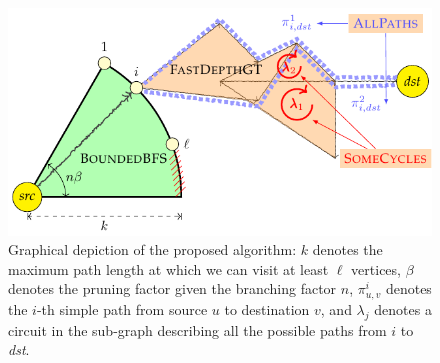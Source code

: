 \documentclass[sigconf]{acmart}
\begin{document}
\begin{figure}[!t]
\includegraphics[width=\linewidth]{fig/algo_intuition}
\caption{Graphical depiction of the proposed algorithm: $k$ denotes the maximum path length at which we can visit at least $\ell$ vertices, $\beta$ denotes the pruning factor given the branching factor $n$, $\pi_{u,v}^i$ denotes the $i$-th simple path from source $u$ to destination $v$, and $\lambda_j$ denotes a circuit in the sub-graph describing all the possible paths from $i$ to \textit{dst}.}\label{fig:depict}
\end{figure}
\end{document}
